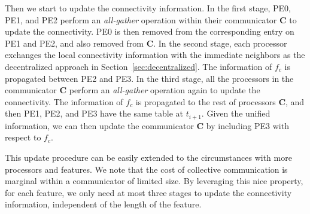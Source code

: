Then we start to update the connectivity information. In the first stage, PE0, PE1, and PE2 perform an \emph{all-gather} operation within their communicator $\textbf{C}$ to update the connectivity. PE0 is then removed from the corresponding entry on PE1 and PE2, and also removed from $\textbf{C}$. In the second stage, each processor exchanges the local connectivity information with the immediate neighbors as the decentralized approach in Section~\ref{sec:decentralized}. The information of $f_c$ is propagated between PE2 and PE3. In the third stage, all the processors in the communicator $\textbf{C}$ perform an \emph{all-gather} operation again to update the connectivity. The information of $f_c$ is propagated to the rest of processors $\textbf{C}$, and then PE1, PE2, and PE3 have the same table at $t_{i+1}$. Given the unified information, we can then update the communicator $\textbf{C}$ by including PE3 with respect to $f_c$. 

This update procedure can be easily extended to the circumstances with more processors and features. We note that the cost of collective communication is marginal within a communicator of limited size. By leveraging this nice property, for each feature, we only need at most three stages to update the connectivity information, independent of the length of the feature.